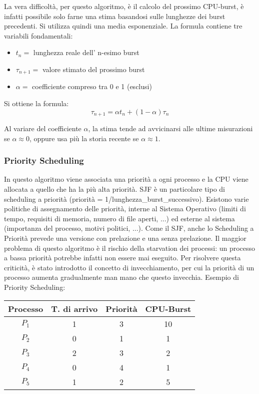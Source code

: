 \documentclass[a4]{article}
\begin{document}
La vera difficoltà, per questo algoritmo, è il calcolo del prossimo CPU-burst, è infatti possibile solo farne una stima basandosi sulle lunghezze dei burst precedenti. Si utilizza quindi una media esponenziale. La formula contiene tre variabili fondamentali:
\begin{itemize}
    \item $t_n =$ lunghezza reale dell' n-esimo burst
    \item $\tau_{n+1} =$ valore stimato del prossimo burst
    \item $\alpha =$ coefficiente compreso tra 0 e 1 (esclusi)
\end{itemize}

Si ottiene la formula: \newline
$$
    \tau_{n+1} = \alpha t_n + (1 - \alpha)\tau_n
$$

Al variare del coefficiente $\alpha$, la stima tende ad avvicinarsi alle ultime misurazioni se $\alpha \approx 0$, oppure usa più la storia recente se $\alpha \approx 1$.

\subsubsection{Priority Scheduling}
In questo algoritmo viene associata una priorità a ogni processo e la CPU viene allocata a quello che ha la più alta priorità. SJF è un particolare tipo di scheduling a priorità (priorità = 1/lunghezza\_burst\_successivo). \newline
Esistono varie politiche di assegnamento delle priorità, interne al Sistema Operativo (limiti di tempo, requisiti di memoria, numero di file aperti, ...) ed esterne al sistema (importanza del processo, motivi politici, ...). Come il SJF, anche lo Scheduling a Priorità prevede una versione con prelazione e una senza prelazione.\newline
Il maggior problema di questo algoritmo è il rischio della starvation dei processi: un processo a bassa priorità potrebbe infatti non essere mai eseguito. Per risolvere questa criticità, è stato introdotto il concetto di invecchiamento, per cui la priorità di un processo aumenta gradualmente man mano che questo invecchia. \newline
Esempio di Priority Scheduling:

\begin{table}[h!]
    \centering
    \label{my-label}
    \begin{tabular}{|c|c|c|c|}
        \hline
        Processo & T. di arrivo & Priorità & CPU-Burst \\ \hline
        $P_1$    & 1            & 3        & 10        \\ \hline
        $P_2$    & 0            & 1        & 1         \\ \hline
        $P_3$    & 2            & 3        & 2         \\ \hline
        $P_4$    & 0            & 4        & 1         \\ \hline
        $P_5$    & 1            & 2        & 5         \\ \hline
    \end{tabular}
\end{table}
\end{document}
